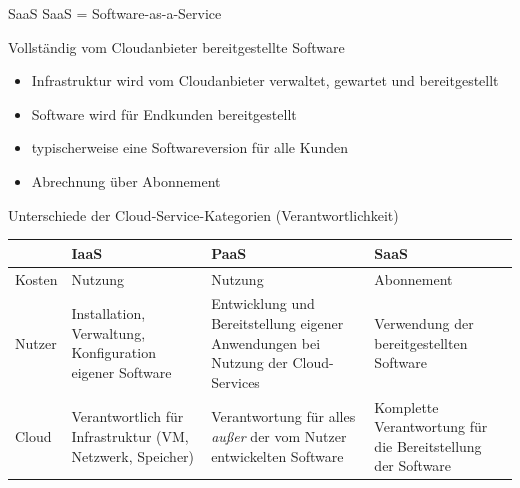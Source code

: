 \begin{flashcard}[Definition]{SaaS}
    SaaS = Software-as-a-Service

    Vollständig vom Cloudanbieter bereitgestellte Software
    \begin{itemize}
        \item Infrastruktur wird vom Cloudanbieter verwaltet, gewartet und bereitgestellt
        \item Software wird für Endkunden bereitgestellt
        \item typischerweise eine Softwareversion für alle Kunden
        \item Abrechnung über Abonnement
    \end{itemize}
\end{flashcard}

\begin{flashcard}[\ ]{Unterschiede der Cloud-Service-Kategorien (Verantwortlichkeit)}
    \begin{tabular}{l|p{34mm}p{34mm}p{34mm}}
                & \textbf{IaaS}                                             & \textbf{PaaS}                                                                     & \textbf{SaaS} \\
        \hline
        Kosten & Nutzung                                                   & Nutzung                                                                           & Abonnement                                                  \\
        Nutzer & Installation, Verwaltung, Konfiguration eigener Software  & Entwicklung und Bereitstellung eigener Anwendungen bei Nutzung der Cloud-Services & Verwendung der bereitgestellten Software                    \\
        Cloud  & Verantwortlich für Infrastruktur (VM, Netzwerk, Speicher) & Verantwortung für alles \emph{außer} der vom Nutzer entwickelten Software         & Komplette Verantwortung für die Bereitstellung der Software \\
    \end{tabular}
\end{flashcard}
